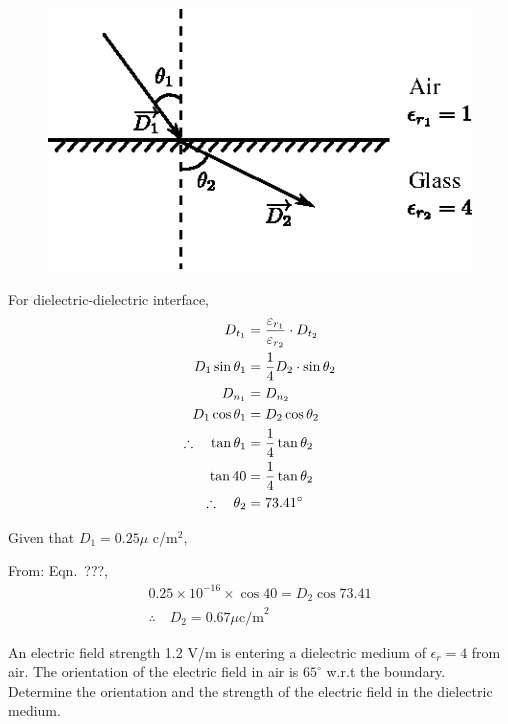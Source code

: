 \begin{solution}
~

\begin{figure}[H]
\centering
\includegraphics[scale=1.1]{images/fig4.eps}\label{chap27-fig4}
\end{figure}

For dielectric-dielectric interface,
\begin{align}
D_{t_{1}} & = \dfrac{\varepsilon_{r_{1}}}{\varepsilon_{r_{2}}} \cdot D_{t_{2}}\notag\\
D_{1} \sin \theta_{1} & = \dfrac{1}{4} D_{2} \cdot \sin \theta_{2}\label{??}\\
D_{n_{1}} & = D_{n_{2}}\notag\\
D_{1} \cos \theta_{1} & = D_{2} \cos \theta_{2}\label{??}\\
\therefore\quad \tan \theta_{1} & = \dfrac{1}{4} \tan \theta_{2}\notag\\
\tan 40 & = \dfrac{1}{4} \tan \theta_{2}\notag\\
\therefore\quad \theta_{2} & = 73.41^{\circ}\notag
\end{align}

Given that $D_{1} = 0.25\mu$ c/m$^{2}$,

From: Eqn.~???, 
\begin{gather*}
0.25\times 10^{-16} \times \cos 40 = D_{2} \cos 73.41\\
\therefore\quad D_{2} = 0.67\mu \text{c/m}^{2}
\end{gather*}
\end{solution}

\begin{problem}
An electric field strength 1.2 V/m is entering a dielectric medium of $\epsilon_{r} = 4$ from air. The orientation of the electric field in air is $65^{\circ}$ w.r.t the boundary. Determine the orientation and the strength of the electric field in the dielectric medium. 
\end{problem}


